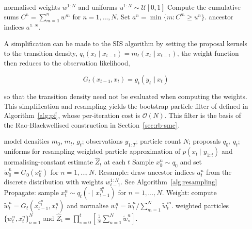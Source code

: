 \begin{algorithm}[H]
\caption{Multinomial resampling}
\label{alg:resampling}
\begin{algorithmic}[1]
\Require normalised weights $w^{1:N}$ and uniforms $u^{1:N} \sim \mathcal{U}[0,1]$
\State Compute the cumulative sums $C^n = \sum_{m=1}^n w^m$ for $n = 1, \ldots, N$.
    \State Set $a^n = \min\{m : C^m \geq u^n\}$.
\EndFor
\State \Return ancestor indices $a^{1:N}$.
\end{algorithmic}
\end{algorithm}

A simplification can be made to the SIS algorithm by setting the proposal kernels to the transition density, $q_t(x_t \mid x_{t-1}) = m_t(x_t \mid x_{t-1})$, the weight function then reduces to the observation likelihood,

\begin{equation*}
    G_t(x_{t-1}, x_t) = g_t(y_t \mid x_t)
\end{equation*}

so that the transition density need not be evaluated when computing the weights. This simplification and resampling yields the bootstrap particle filter of \citet{gordonsalmondsmith1993} defined in Algorithm~\ref{alg:pf}, whose per-iteration cost is $\mathcal{O}(N)$. This filter is the basis of the Rao-Blackwellised construction in Section~\ref{sec:rb-smc}.

\begin{algorithm}[H]
\caption{Bootstrap particle filter}
\label{alg:pf}
\begin{algorithmic}[1]
\Require model densities $m_0$, $m_t$, $g_t$; observations $y_{1:T}$; particle count $N$; proposals $q_0$, $q_t$; uniforms for resampling
\Ensure weighted particle approximation of $p(x_t \mid y_{1:t})$ and normalising-constant estimate $\widehat{Z}_t$ at each $t$
\State Sample $x_0^n \sim q_0$ and set $\tilde{w}_0^n = G_0(x_0^n)$ for $n = 1, \ldots, N$.
    \State Resample: draw ancestor indices $a_t^n$ from the discrete distribution with weights $w_{t-1}^{1:N}$. See Algorithm~\ref{alg:resampling}
    \State Propagate: sample $x_t^n \sim q_t(\cdot \mid x_{t-1}^{a_t^n})$ for $n = 1, \ldots, N$.
    \State Weight: compute $\tilde{w}_t^n = G_t(x_{t-1}^{a_t^n}, x_t^n)$ and normalise $w_t^n = \tilde{w}_t^n / \sum_{m=1}^N \tilde{w}_t^m$.
\EndFor
\State \Return weighted particles $\{w_t^n, x_t^n\}_{n=1}^N$ and $\widehat{Z}_t = \prod_{s=0}^t \left[ \frac{1}{N} \sum_{n=1}^N \tilde{w}_s^n \right]$.
\end{algorithmic}
\end{algorithm} 

